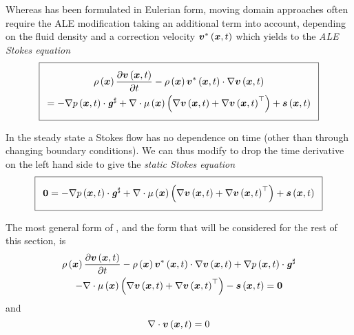 Whereas  has been formulated in Eulerian
form, moving domain approaches often require the ALE modification taking an
additional term into account, depending on the fluid density and a correction
velocity $ \boldsymbol{v}^*\left( \boldsymbol{x},t \right) $ which yields to the \emph{ALE Stokes
  equation} \ie
\begin{equation}
  \addtolength{\fboxsep}{5pt}
  \boxed{
    \begin{gathered}
      \fnof{\rho}{\vectr{x}}\delby{\fnof{\vectr{v}}{\vectr{x},t}}{t}
      -\fnof{\rho}{\vectr{x}}\dotprod{\fnof{\vectr{v}^{*}}{\vectr{x},t}}{
        \gradient{}{\fnof{\vectr{v}}{\vectr{x},t}}}\\
      =\dotprod{-\gradient{}{\fnof{p}{\vectr{x},t}}}{\sharptensor{\tensor{g}}}
      +\divergence{}{\fnof{\mu}{\vectr{x}}\pbrac{\gradient{}{\fnof{\vectr{v}}{\vectr{x},t}+
            \transpose{\gradient{}{\fnof{\vectr{v}}{\vectr{x},t}}}}}}
      +\fnof{\vectr{s}}{\vectr{x},t}
    \end{gathered}
    }
  \label{eqn:StokesEquationALEMomentum}
\end{equation}

In the steady state a Stokes flow has no dependence on time (other than
through changing boundary conditions). We can thus modify
 to drop the time derivative on the left
hand side to give the \emph{static Stokes equation} \ie
\begin{equation}
  \addtolength{\fboxsep}{5pt}
  \boxed{
    \vectr{0}=\dotprod{-\gradient{}{\fnof{p}{\vectr{x},t}}}{\sharptensor{\tensor{g}}}
    +\divergence{}{\fnof{\mu}{\vectr{x}}\pbrac{\gradient{}{\fnof{\vectr{v}}{\vectr{x},t}+
          \transpose{\gradient{}{\fnof{\vectr{v}}{\vectr{x},t}}}}}}
    +\fnof{\vectr{s}}{\vectr{x},t}
  }
  \label{eqn:StokesEquationStaticMomentum}
\end{equation}

The most general form of
, and
the form that will be considered for the rest of this section, is
\begin{multline}
  \fnof{\rho}{\vectr{x}}\delby{\fnof{\vectr{v}}{\vectr{x},t}}{t}
  -\fnof{\rho}{\vectr{x}}\dotprod{\fnof{\vectr{v}^{*}}{\vectr{x},t}}{
    \gradient{}{\fnof{\vectr{v}}{\vectr{x},t}}}
  +\dotprod{\gradient{}{\fnof{p}{\vectr{x},t}}}{\sharptensor{\tensor{g}}}\\
  -\divergence{}{\fnof{\mu}{\vectr{x}}\pbrac{\gradient{}{\fnof{\vectr{v}}{\vectr{x},t}+
        \transpose{\gradient{}{\fnof{\vectr{v}}{\vectr{x},t}}}}}}
  -\fnof{\vectr{s}}{\vectr{x},t}=\vectr{0}
  \label{eqn:StokesEquationGenMomentum}
\end{multline}
and
\begin{equation}
  \divergence{}{\fnof{\vectr{v}}{\vectr{x},t}}=0
  \label{eqn:StokesEquationGenMass}
\end{equation}

